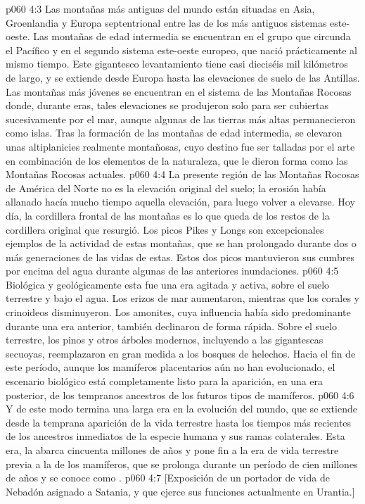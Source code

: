 \vs p060 4:3 \pc Las montañas más antiguas del mundo están situadas en Asia, Groenlandia y Europa septentrional entre las de los más antiguos sistemas este\hyp{}oeste. Las montañas de edad intermedia se encuentran en el grupo que circunda el Pacífico y en el segundo sistema este\hyp{}oeste europeo, que nació prácticamente al mismo tiempo. Este gigantesco levantamiento tiene casi dieciséis mil kilómetros de largo, y se extiende desde Europa hasta las elevaciones de suelo de las Antillas. Las montañas más jóvenes se encuentran en el sistema de las Montañas Rocosas donde, durante eras, tales elevaciones se produjeron solo para ser cubiertas sucesivamente por el mar, aunque algunas de las tierras más altas permanecieron como islas. Tras la formación de las montañas de edad intermedia, se elevaron unas altiplanicies realmente montañosas, cuyo destino fue ser talladas por el arte en combinación de los elementos de la naturaleza, que le dieron forma como las Montañas Rocosas actuales.
\vs p060 4:4 La presente región de las Montañas Rocosas de América del Norte no es la elevación original del suelo; la erosión había allanado hacía mucho tiempo aquella elevación, para luego volver a elevarse. Hoy día, la cordillera frontal de las montañas es lo que queda de los restos de la cordillera original que resurgió. Los picos Pikes y Longs son excepcionales ejemplos de la actividad de estas montañas, que se han prolongado durante dos o más generaciones de las vidas de estas. Estos dos picos mantuvieron sus cumbres por encima del agua durante algunas de las anteriores inundaciones.
\vs p060 4:5 Biológica y geológicamente esta fue una era agitada y activa, sobre el suelo terrestre y bajo el agua. Los erizos de mar aumentaron, mientras que los corales y crinoideos disminuyeron. Los amonites, cuya influencia había sido predominante durante una era anterior, también declinaron de forma rápida. Sobre el suelo terrestre, los pinos y otros árboles modernos, incluyendo a las gigantescas secuoyas, reemplazaron en gran medida a los bosques de helechos. Hacia el fin de este período, aunque los mamíferos placentarios aún no han evolucionado, el escenario biológico está completamente listo para la aparición, en una era posterior, de los tempranos ancestros de los futuros tipos de mamíferos.
\vs p060 4:6 \pc Y de este modo termina una larga era en la evolución del mundo, que se extiende desde la temprana aparición de la vida terrestre hasta los tiempos más recientes de los ancestros inmediatos de la especie humana y sus ramas colaterales. Esta era, la  abarca cincuenta millones de años y pone fin a la era de vida terrestre previa a la de los mamíferos, que se prolonga durante un período de cien millones de años y se conoce como .
\vsetoff
\vs p060 4:7 [Exposición de un portador de vida de Nebadón asignado a Satania, y que ejerce sus funciones actualmente en Urantia.]
